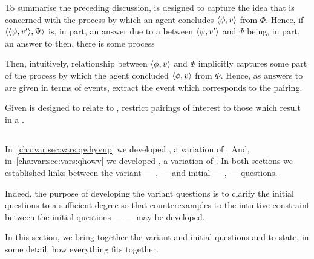 \begin{note}
  To summarise the preceding discussion, \linkH{} is designed to capture the idea that \qHow{} is concerned with the process by which an agent concludes \(\langle \phi, v \rangle\) from \(\Phi\).
  Hence, if \(\langle \langle \psi, v' \rangle, \Psi \rangle\) is, in part, an answer \qHow{} due to a \ros{} between \(\langle \psi, v' \rangle\) and \(\Psi\) being, in part, an answer to \qWhyVnP{} then, there is some process 


  Then, intuitively, relationship between \(\langle \phi, v \rangle\) and \(\Psi\) implicitly captures some part of the process by which the agent concluded \(\langle \phi, v \rangle\) from \(\Phi\).
  Hence, as answers to \qHowV{} are given in terms of events, extract the event which corresponds to the pairing.

  Given \qHowV{} is designed to relate to \qWhyVnP{}, restrict pairings of interest to those which result in a .
\end{note}

\subsection{\issueConstraint{}}
\label{cha:var:sec:vars:issue}

\begin{note}
  In~\autoref{cha:var:sec:vars:qwhyvnp} we developed \qWhyVnP{}, a variation of \qWhy{}.
  And, in~\autoref{cha:var:sec:vars:qhowv} we developed \qHowV{}, a variation of \qHow{}.
  In both sections we established links between the variant --- \qWhyVnP{}, \qHowV{}  --- and initial --- \qWhy{}, \qHow{} --- questions.

  Indeed, the purpose of developing the variant questions is to clarify the initial questions to a sufficient degree so that counterexamples to the intuitive constraint between the initial questions --- \issueInclusion{} --- may be developed.

  In this section, we bring together the variant and initial questions and \issueInclusion{} to state, in some detail, how everything fits together.
\end{note}

